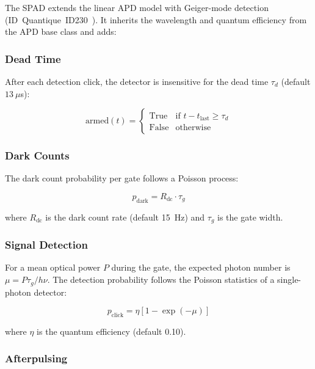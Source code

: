 \documentclass[11pt,a4paper]{article}
\begin{document}
The SPAD extends the linear APD model with Geiger-mode detection
(ID~Quantique~ID230~\cite{id230}).  It inherits the wavelength and
quantum efficiency from the APD base class and adds:

\subsubsection{Dead Time}

After each detection click, the detector is insensitive for the dead
time $\tau_d$ (default $13~\mu$s):

\begin{equation}
  \text{armed}(t) = \begin{cases}
    \text{True} & \text{if } t - t_{\text{last}} \ge \tau_d \\
    \text{False} & \text{otherwise}
  \end{cases}
\end{equation}

\subsubsection{Dark Counts}

The dark count probability per gate follows a Poisson process:

\begin{equation}
  p_{\text{dark}} = R_{\text{dc}} \cdot \tau_g
\end{equation}

where $R_{\text{dc}}$ is the dark count rate (default 15~Hz) and
$\tau_g$ is the gate width.

\subsubsection{Signal Detection}

For a mean optical power $P$ during the gate, the expected photon number
is $\mu = P\tau_g / h\nu$.  The detection probability follows the
Poisson statistics of a single-photon detector:

\begin{equation}
  p_{\text{click}} = \eta\left[1 - \exp(-\mu)\right]
\end{equation}

where $\eta$ is the quantum efficiency (default 0.10).

\subsubsection{Afterpulsing}
\end{document}

